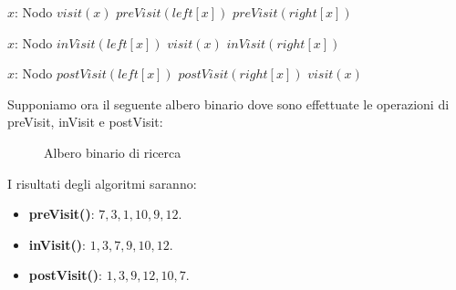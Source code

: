\begin{minipage}[h]{0.31\linewidth}
	\begin{algorithm}[H]
		\caption{preVisit(x)}
		\begin{algorithmic}[1]
			\Require $x$: Nodo
				\State $visit(x)$
				\State $preVisit(left[x])$
				\State $preVisit(right[x])$
			\EndIf
		\end{algorithmic}
	\end{algorithm}
\end{minipage}
\hspace{0.001\textwidth}
\begin{minipage}[h]{0.3\linewidth}
	\begin{algorithm}[H]
		\caption{inVisit(x)}
		\begin{algorithmic}[1]
			\Require $x$: Nodo
				\State $inVisit(left[x])$
				\State $visit(x)$
				\State $inVisit(right[x])$
			\EndIf
		\end{algorithmic}
	\end{algorithm}
\end{minipage}
\hspace{0.001\textwidth}
\begin{minipage}[h]{0.32\linewidth}
	\begin{algorithm}[H]
		\caption{postVisit(x)}
		\begin{algorithmic}[1]
			\Require $x$: Nodo
				\State $postVisit(left[x])$
				\State $postVisit(right[x])$
				\State $visit(x)$
			\EndIf
		\end{algorithmic}
	\end{algorithm}
\end{minipage}
\vspace{0.01\linewidth}

\noindent Supponiamo ora il seguente albero binario dove sono effettuate le operazioni di preVisit, inVisit e postVisit:
\begin{figure}[h]
	\centering
	\caption{Albero binario di ricerca}
\end{figure}

\noindent I risultati degli algoritmi saranno: \begin{itemize}
	\item \textbf{preVisit()}: $7, 3, 1, 10, 9, 12$.
	\item \textbf{inVisit()}: $1, 3, 7, 9, 10, 12$.
	\item \textbf{postVisit()}: $1, 3, 9, 12, 10, 7$.
\end{itemize}

